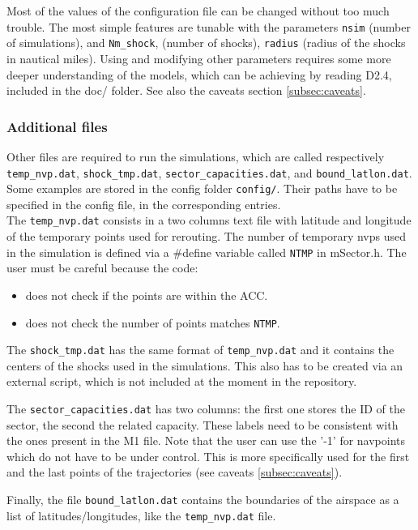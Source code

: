 \documentclass[12pt]{article}
\begin{document}
Most of the values of the configuration file can be changed without too much trouble. The most simple features are tunable with the parameters \verb|nsim| (number of simulations), and \verb|Nm_shock|, (number of shocks), \verb|radius| (radius of the shocks in nautical miles). Using and modifying other parameters requires some more deeper understanding of the models, which can be achieving by reading D2.4, included in the doc/ folder. See also the caveats section \ref{subsec:caveats}.


\subsubsection{Additional files}
Other files are required to run the simulations, which are called respectively \verb|temp_nvp.dat|, \verb|shock_tmp.dat|,  \verb|sector_capacities.dat|, and \verb|bound_latlon.dat|. Some examples are stored in the config folder \verb|config/|. Their paths have to be specified in the config file, in the corresponding entries.\\

The \verb|temp_nvp.dat| consists in a two columns text file with latitude and longitude of the temporary points used for rerouting. The number of temporary nvps used in the simulation is defined via a \#define variable called \verb|NTMP| in mSector.h. The user must be careful because the code:
\begin{itemize}
\item does not check if the points are within the ACC. 
\item does not check the number of points matches \verb|NTMP|.
\end{itemize}


The \verb|shock_tmp.dat| has the same format of \verb|temp_nvp.dat| and it contains the centers of the shocks used in the simulations. This also has to be created via an external script, which is not included at the moment in the repository.

The \verb|sector_capacities.dat| has two columns: the first one stores the ID of the sector, the second the related capacity. These labels need to be consistent with the ones present in the M1 file. Note that the user can use the '-1' for navpoints which do not have to be under control. This is more specifically used for the first and the last points of the trajectories (see caveats \ref{subsec:caveats}).

Finally, the file \verb|bound_latlon.dat| contains the boundaries of the airspace as a list of latitudes/longitudes, like the \verb|temp_nvp.dat| file.
\end{document}

